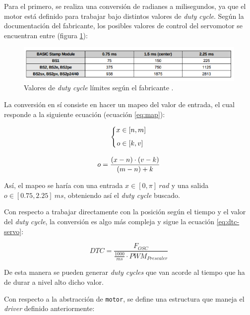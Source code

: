 Para el primero, se realiza una conversión de radianes a milisegundos, ya que el motor
está definido para trabajar bajo distintos valores de \textit{duty cycle}. Según la
documentación del fabricante, los posibles valores de control del servomotor se
encuentran entre (figura \ref{fig:servo_dtc}):

\begin{figure}[H]
    \centering
    \includegraphics[width=.7\linewidth]{pictures/servo_duty_cycle.png}
    \caption{Valores de \textit{duty cycle} límites según el fabricante \cite{90000005ServomotorParallax}.}
    \label{fig:servo_dtc}
\end{figure}

La conversión en sí consiste en hacer un mapeo del valor de entrada, el cual responde
a la siguiente ecuación (ecuación \ref{eq:map}):

\begin{gather*}
    \left\{\begin{aligned}
        x & \in \left[n, m\right] \\[1ex]
        o & \in \left[k, v\right]    
    \end{aligned}\right. \notag \\[2ex]
    o = \frac{\left(x - n\right) \cdot \left(v - k\right)}{\left(m - n\right) + k} \\ \label{eq:map}
\end{gather*}

Así, el mapeo se haría con una entrada $x \in \left[0, \pi\right]~rad$ y una salida 
$o \in \left[0.75, 2.25\right]~ms$, obteniendo así el \textit{duty cycle} buscado.

Con respecto a trabajar directamente con la posición según el tiempo y el valor del
\textit{duty cycle}, la conversión es algo más compleja y sigue la ecuación \ref{eq:dtc-servo}:

\begin{equation}\label{eq:dtc-servo}
    DTC = \frac{F_{OSC}}{\frac{1000}{ms} \cdot PWM_{Prescaler}}
\end{equation}

De esta manera se pueden generar \textit{duty cycles} que van acorde al tiempo que
ha de durar a nivel alto dicho valor.

Con respecto a la abstracción de \texttt{motor}, se define una estructura que
maneja el \textit{driver} definido anteriormente:

